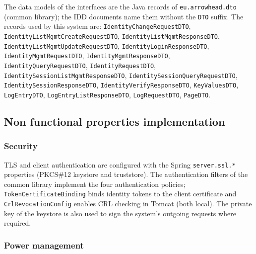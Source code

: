\documentclass[a4paper]{arrowhead}
\begin{document}
The data models of the interfaces are the Java records of \texttt{eu.arrowhead.dto} (common library); the IDD documents name them without the \texttt{DTO} suffix. The records used by this system are: \texttt{Identity\allowbreak{}Change\allowbreak{}Request\allowbreak{}DTO}, \texttt{Identity\allowbreak{}List\allowbreak{}Mgmt\allowbreak{}Create\allowbreak{}Request\allowbreak{}DTO}, \texttt{Identity\allowbreak{}List\allowbreak{}Mgmt\allowbreak{}Response\allowbreak{}DTO}, \texttt{Identity\allowbreak{}List\allowbreak{}Mgmt\allowbreak{}Update\allowbreak{}Request\allowbreak{}DTO}, \texttt{Identity\allowbreak{}Login\allowbreak{}Response\allowbreak{}DTO}, \texttt{Identity\allowbreak{}Mgmt\allowbreak{}Request\allowbreak{}DTO}, \texttt{Identity\allowbreak{}Mgmt\allowbreak{}Response\allowbreak{}DTO}, \texttt{Identity\allowbreak{}Query\allowbreak{}Request\allowbreak{}DTO}, \texttt{IdentityRequestDTO}, \texttt{Identity\allowbreak{}Session\allowbreak{}List\allowbreak{}Mgmt\allowbreak{}Response\allowbreak{}DTO}, \texttt{Identity\allowbreak{}Session\allowbreak{}Query\allowbreak{}Request\allowbreak{}DTO}, \texttt{Identity\allowbreak{}Session\allowbreak{}Response\allowbreak{}DTO}, \texttt{Identity\allowbreak{}Verify\allowbreak{}Response\allowbreak{}DTO}, \texttt{KeyValuesDTO}, \texttt{LogEntryDTO}, \texttt{Log\allowbreak{}Entry\allowbreak{}List\allowbreak{}Response\allowbreak{}DTO}, \texttt{LogRequestDTO}, \texttt{PageDTO}.

\subsection{Non functional properties implementation}

\subsubsection{Security}

TLS and client authentication are configured with the Spring \texttt{server.ssl.*} properties (PKCS\#12 keystore and truststore). The authentication filters of the common library implement the four authentication policies; \texttt{TokenCertificateBinding} binds identity tokens to the client certificate and \texttt{CrlRevocationConfig} enables CRL checking in Tomcat (both local). The private key of the keystore is also used to sign the system's outgoing requests where required.

\subsubsection{Power management}
\end{document}
